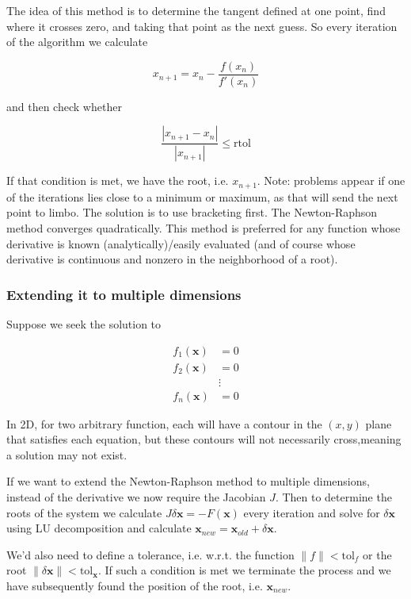 \documentclass[a4paper]{article}
\begin{document}
The idea of this method is to determine the tangent defined at one point, find where it crosses zero, and taking that point as the next guess. So every iteration of the algorithm we calculate

$$x_{n+1}=x_n-\frac{f(x_n)}{f'(x_n)}$$

and then check whether

$$\frac{|x_{n+1}-x_n|}{|x_{n+1}|}\le \text{rtol}$$

If that condition is met, we have the root, i.e. $x_{n+1}$. Note: problems appear if one of the iterations lies close to a minimum or maximum, as that will send the next point to limbo. The solution is to use bracketing first. The Newton-Raphson method converges quadratically. This method is preferred for any function whose derivative is known (analytically)/easily evaluated (and of course whose derivative is continuous and nonzero in the neighborhood of a root). 

\subsubsection{Extending it to multiple dimensions}

Suppose we seek the solution to

\begin{align*}
    f_1(\mathbf{x})&=0\\
    f_2(\mathbf{x})&=0\\
    &\vdots\\
    f_n(\mathbf{x})&=0
\end{align*}

In 2D, for two arbitrary function, each will have a contour in the $(x,y)$ plane that satisfies each equation, but these contours will not necessarily cross,meaning a solution may not exist.

\bigskip

If we want to extend the Newton-Raphson method to multiple dimensions, instead of the derivative we now require the Jacobian $J$. Then to determine the roots of the system we calculate $J\delta \mathbf{x}=-F(\mathbf{x})$ every iteration and solve for $\delta\mathbf{x}$ using LU decomposition and calculate $\mathbf{x}_{new}=\mathbf{x}_{old}+\delta\mathbf{x}$.

\bigskip

We'd also need to define a tolerance, i.e. w.r.t. the function $\|f\|<\text{tol}_f$ or the root $\|\delta\mathbf{x}\|<\text{tol}_\mathbf{x}$. If such a condition is met we terminate the process and we have subsequently found the position of the root, i.e. $\mathbf{x}_{new}$.
\end{document}
